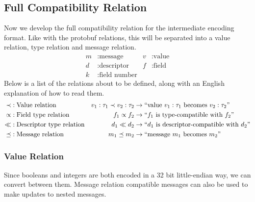 \subsection{Full Compatibility Relation}\label{sec:ip-compat-rel}

Now we develop the full compatibility relation for the intermediate encoding
format. Like with the protobuf relations, this will be separated into a value
relation, type relation and message relation.
\begin{align*}
  m &: \text{message} & v &: \text{value} \\
  d &: \text{descriptor} & f &: \text{field} \\
  k &: \text{field number}
\end{align*}
Below is a list of the relations about to be defined, along with an English
explanation of how to read them.
\begin{align*}
  \prec &: \text{Value relation} & v_1 : \tau_1 \prec v_2 : \tau_2 &\rightarrow ``\text{value } v_1 : \tau_1 \text{ becomes } v_2 :
                                           \tau_2 " \\
  \propto &: \text{Field type relation} & f_1 \propto f_2 &\rightarrow ``f_1 \text{ is type-compatible with }
                                          f_2" \\
  \ll &: \text{Descriptor type relation} & d_1 \ll d_2 &\rightarrow ``d_1 \text{ is
                                                     descriptor-compatible with } d_2" \\
  \preceq &: \text{Message relation} & m_1 \preceq m_2 &\rightarrow ``\text{message } m_1 \text{ becomes } m_2"
\end{align*}

\subsubsection{Value Relation}\label{sec:ip-val-rel}
Since booleans and integers are both encoded in a 32 bit little-endian way, we
can convert between them. Message relation compatible messages can also be used
to make updates to nested messages.

\begin{mathpar}




\end{mathpar}

